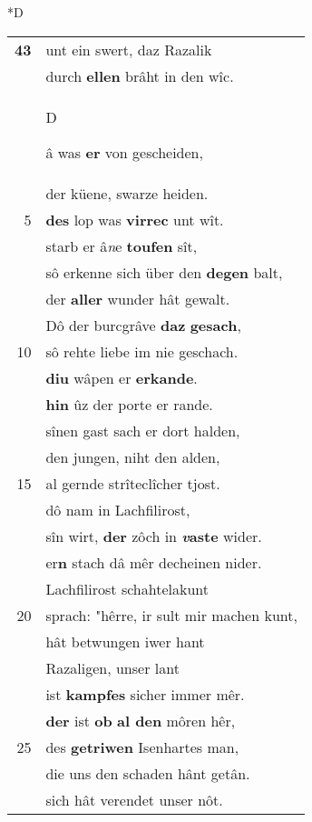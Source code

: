 \documentclass[8pt,a4paper,notitlepage]{article}
\begin{document}
\begin{table}[ht]
\begin{minipage}[t]{0.5\linewidth}
\small
\begin{center}*D
\end{center}
\begin{tabular}{rl}
\textbf{43} & unt ein swert, daz Razalik\\ 
 & durch \textbf{ellen} brâht in den wîc.\\ 
 & \begin{large}D\end{large}â was \textbf{er} von gescheiden,\\ 
 & der küene, swarze heiden.\\ 
5 & \textbf{des} lop was \textbf{virrec} unt wît.\\ 
 & starb er â\textit{n}e \textbf{toufen} sît,\\ 
 & sô erkenne sich über den \textbf{degen} balt,\\ 
 & der \textbf{aller} wunder hât gewalt.\\ 
 & Dô der burcgrâve \textbf{daz} \textbf{gesach},\\ 
10 & sô rehte liebe im nie geschach.\\ 
 & \textbf{diu} wâpen er \textbf{erkande}.\\ 
 & \textbf{hin} ûz der porte er rande.\\ 
 & sînen gast sach er dort halden,\\ 
 & den jungen, niht den alden,\\ 
15 & al gernde strîteclîcher tjost.\\ 
 & dô nam in Lachfilirost,\\ 
 & sîn wirt, \textbf{der} zôch in \textbf{\textit{v}aste} wider.\\ 
 & er\textbf{n} stach dâ mêr decheinen nider.\\ 
 & Lachfilirost schahtelakunt\\ 
20 & sprach: "hêrre, ir sult mir machen kunt,\\ 
 & hât betwungen iwer hant\\ 
 & Razaligen, unser lant\\ 
 & ist \textbf{kampfes} sicher immer mêr.\\ 
 & \textbf{der} ist \textbf{ob} \textbf{al den} môren hêr,\\ 
25 & des \textbf{getriwen} Isenhartes man,\\ 
 & die uns den schaden hânt getân.\\ 
 & sich hât verendet unser nôt.\\ 

\end{tabular}
\end{minipage}
\end{table}
\end{document}
